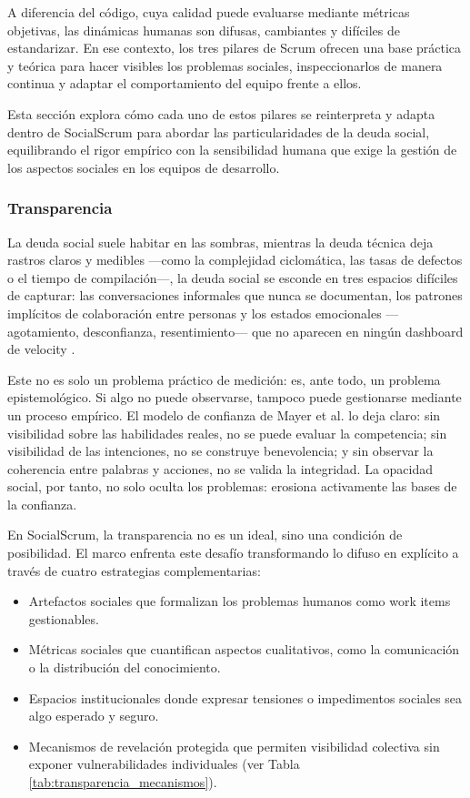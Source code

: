 A diferencia del código, cuya calidad puede evaluarse mediante métricas objetivas, las dinámicas humanas son difusas, cambiantes y difíciles de estandarizar.
En ese contexto, los tres pilares de Scrum ofrecen una base práctica y teórica para hacer visibles los problemas sociales, inspeccionarlos de manera continua y adaptar el comportamiento del equipo frente a ellos.

Esta sección explora cómo cada uno de estos pilares se reinterpreta y adapta dentro de SocialScrum para abordar las particularidades de la deuda social, equilibrando el rigor empírico con la sensibilidad humana que exige la gestión de los aspectos sociales en los equipos de desarrollo.

\subsubsection{Transparencia}

La deuda social suele habitar en las sombras, mientras la deuda técnica deja rastros claros y medibles —como la complejidad ciclomática, las tasas de defectos o el tiempo de compilación—, la deuda social se esconde en tres espacios difíciles de capturar:
las conversaciones informales que nunca se documentan, los patrones implícitos de colaboración entre personas y los estados emocionales —agotamiento, desconfianza, resentimiento— que no aparecen en ningún dashboard de velocity \cite{tamburri2015insights,saeeda2024nontechnicaldebt}.

Este no es solo un problema práctico de medición: es, ante todo, un problema epistemológico.
Si algo no puede observarse, tampoco puede gestionarse mediante un proceso empírico.
El modelo de confianza de Mayer et al. \cite{mayer_integrative_1995} lo deja claro: sin visibilidad sobre las habilidades reales, no se puede evaluar la competencia; sin visibilidad de las intenciones, no se construye benevolencia; y sin observar la coherencia entre palabras y acciones, no se valida la integridad.
La opacidad social, por tanto, no solo oculta los problemas: erosiona activamente las bases de la confianza.

En SocialScrum, la transparencia no es un ideal, sino una condición de posibilidad.
El marco enfrenta este desafío transformando lo difuso en explícito a través de cuatro estrategias complementarias:
\begin{itemize}
    \item Artefactos sociales que formalizan los problemas humanos como work items gestionables.
    \item Métricas sociales que cuantifican aspectos cualitativos, como la comunicación o la distribución del conocimiento.
    \item Espacios institucionales donde expresar tensiones o impedimentos sociales sea algo esperado y seguro.
    \item Mecanismos de revelación protegida que permiten visibilidad colectiva sin exponer vulnerabilidades individuales (ver Tabla \ref{tab:transparencia_mecanismos}).
\end{itemize}

